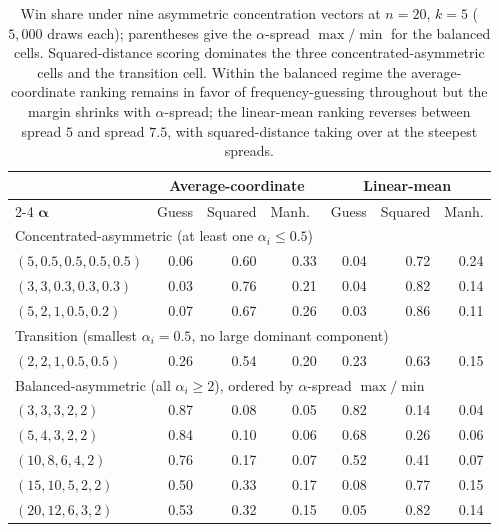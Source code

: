 \begin{table}[h]
\centering
\small
\setlength{\tabcolsep}{4pt}
\begin{tabular}{lrrrrrr}
\hline
& \multicolumn{3}{c}{Average-coordinate} & \multicolumn{3}{c}{Linear-mean}\\
\cline{2-4}\cline{5-7}
\(\boldsymbol\alpha\) & Guess & Squared & Manh.\ & Guess & Squared & Manh.\\
\hline
\multicolumn{7}{l}{Concentrated-asymmetric (at least one \(\alpha_i\le 0.5\))}\\
\((5, 0.5, 0.5, 0.5, 0.5)\)   & 0.06 & 0.60 & 0.33 & 0.04 & 0.72 & 0.24\\
\((3, 3, 0.3, 0.3, 0.3)\)     & 0.03 & 0.76 & 0.21 & 0.04 & 0.82 & 0.14\\
\((5, 2, 1, 0.5, 0.2)\)       & 0.07 & 0.67 & 0.26 & 0.03 & 0.86 & 0.11\\
\hline
\multicolumn{7}{l}{Transition (smallest \(\alpha_i = 0.5\), no large dominant component)}\\
\((2, 2, 1, 0.5, 0.5)\)       & 0.26 & 0.54 & 0.20 & 0.23 & 0.63 & 0.15\\
\hline
\multicolumn{7}{l}{Balanced-asymmetric (all \(\alpha_i\ge 2\)), ordered by \(\alpha\)-spread \(\max/\min\)}\\
\((3, 3, 3, 2, 2)\)\hspace{3pt}{\footnotesize(1.5)}     & 0.87 & 0.08 & 0.05 & 0.82 & 0.14 & 0.04\\
\((5, 4, 3, 2, 2)\)\hspace{3pt}{\footnotesize(2.5)}     & 0.84 & 0.10 & 0.06 & 0.68 & 0.26 & 0.06\\
\((10, 8, 6, 4, 2)\)\hspace{3pt}{\footnotesize(5.0)}    & 0.76 & 0.17 & 0.07 & 0.52 & 0.41 & 0.07\\
\((15, 10, 5, 2, 2)\)\hspace{3pt}{\footnotesize(7.5)}   & 0.50 & 0.33 & 0.17 & 0.08 & 0.77 & 0.15\\
\((20, 12, 6, 3, 2)\)\hspace{3pt}{\footnotesize(10.0)}  & 0.53 & 0.32 & 0.15 & 0.05 & 0.82 & 0.14\\
\hline
\end{tabular}
\caption{Win share under nine asymmetric concentration vectors at \(n=20\), \(k=5\) (\(5{,}000\) draws each); parentheses give the \(\alpha\)-spread \(\max/\min\) for the balanced cells. Squared-distance scoring dominates the three concentrated-asymmetric cells and the transition cell. Within the balanced regime the average-coordinate ranking remains in favor of frequency-guessing throughout but the margin shrinks with \(\alpha\)-spread; the linear-mean ranking reverses between spread \(5\) and spread \(7.5\), with squared-distance taking over at the steepest spreads.}
\label{tab:regime-wins-asymmetric}
\end{table}

